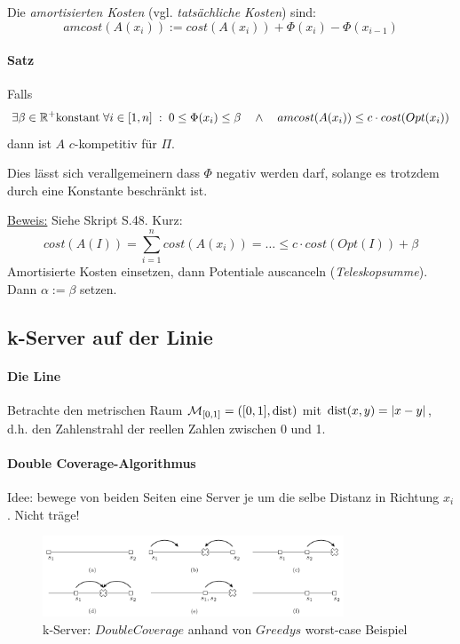 Die \emph{amortisierten Kosten} (vgl. \emph{tatsächliche Kosten}) sind:
$$ amcost(A(x_i)) := cost(A(x_i)) + \Phi(x_i) - \Phi(x_{i-1})$$

\paragraph{Satz}
Falls
$$ \exists \beta \in \mathbb{R}^+ \text{konstant} \; \forall i \in [1,n] \; : \; 0 \leq \Phi(x_i) \leq \beta
\quad \wedge \quad
amcost(A(x_i)) \leq c \cdot cost(Opt(x_i))
$$
dann ist $A$ $c$-kompetitiv für $\Pi$.

Dies lässt sich verallgemeinern dass $\Phi$ negativ werden darf, solange es trotzdem durch
eine Konstante beschränkt ist.

\underline{Beweis:}
Siehe Skript S.48. Kurz:
$$ cost(A(I)) = \sum_{i=1}^n cost(A(x_i)) = \dots \leq c \cdot cost(Opt(I)) + \beta $$
Amortisierte Kosten einsetzen, dann Potentiale auscanceln (\emph{Teleskopsumme}).
Dann $\alpha := \beta$ setzen.

\subsection{k-Server auf der Linie}

\paragraph{Die Line}
Betrachte den metrischen Raum $\mathcal{M}_{[0,1]} = ([0,1], \text{dist})$ mit $\text{dist}(x,y) = |x-y|$,
d.h. den Zahlenstrahl der reellen Zahlen zwischen 0 und 1.

\paragraph{Double Coverage-Algorithmus}
Idee: bewege von beiden Seiten eine Server je um die selbe Distanz in Richtung $x_i$.
Nicht träge!

\begin{figure}[h]
    \centering
    \includegraphics[width=0.8\textwidth]{images/k-server-double-coverage.png}
    \caption{k-Server: $DoubleCoverage$ anhand von $Greedys$ worst-case Beispiel}
    \label{k-server-double-coverage}
\end{figure}

